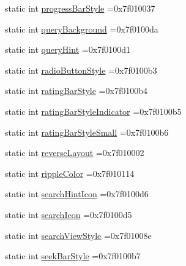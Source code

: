 \begin{DoxyCompactItemize}
\item 
static int \hyperlink{classandroid_1_1support_1_1graphics_1_1drawable_1_1animated_1_1R_1_1attr_aab0f409b24c8668e3fbe6e1fc3211c29}{progress\+Bar\+Style} =0x7f010037
\item 
static int \hyperlink{classandroid_1_1support_1_1graphics_1_1drawable_1_1animated_1_1R_1_1attr_a0306023b5d4883dacd62d9a41e38c608}{query\+Background} =0x7f0100da
\item 
static int \hyperlink{classandroid_1_1support_1_1graphics_1_1drawable_1_1animated_1_1R_1_1attr_a4720a94b3f352aacb47badc751047441}{query\+Hint} =0x7f0100d1
\item 
static int \hyperlink{classandroid_1_1support_1_1graphics_1_1drawable_1_1animated_1_1R_1_1attr_a191038a5c71147a04311b671f74cc7b0}{radio\+Button\+Style} =0x7f0100b3
\item 
static int \hyperlink{classandroid_1_1support_1_1graphics_1_1drawable_1_1animated_1_1R_1_1attr_a27909b0f9ddcebfdedc104a8ae901712}{rating\+Bar\+Style} =0x7f0100b4
\item 
static int \hyperlink{classandroid_1_1support_1_1graphics_1_1drawable_1_1animated_1_1R_1_1attr_a9658313464fe73647655b17e36cd0203}{rating\+Bar\+Style\+Indicator} =0x7f0100b5
\item 
static int \hyperlink{classandroid_1_1support_1_1graphics_1_1drawable_1_1animated_1_1R_1_1attr_ae91fa42b366d98c3a89084501c93d39e}{rating\+Bar\+Style\+Small} =0x7f0100b6
\item 
static int \hyperlink{classandroid_1_1support_1_1graphics_1_1drawable_1_1animated_1_1R_1_1attr_a08e28355209f9e2acee1a23a9474beb7}{reverse\+Layout} =0x7f010002
\item 
static int \hyperlink{classandroid_1_1support_1_1graphics_1_1drawable_1_1animated_1_1R_1_1attr_a7f3d5ddc3c625795d695d54870ec4b82}{ripple\+Color} =0x7f010114
\item 
static int \hyperlink{classandroid_1_1support_1_1graphics_1_1drawable_1_1animated_1_1R_1_1attr_a636b74fcad1e952ad0235e10f94b9322}{search\+Hint\+Icon} =0x7f0100d6
\item 
static int \hyperlink{classandroid_1_1support_1_1graphics_1_1drawable_1_1animated_1_1R_1_1attr_a0ed748bfb2acb60da8ebcdec57c76efc}{search\+Icon} =0x7f0100d5
\item 
static int \hyperlink{classandroid_1_1support_1_1graphics_1_1drawable_1_1animated_1_1R_1_1attr_ad21cbd2fdc86db9838e96d1370a7495d}{search\+View\+Style} =0x7f01008e
\item 
static int \hyperlink{classandroid_1_1support_1_1graphics_1_1drawable_1_1animated_1_1R_1_1attr_ae0cecff2acda4bdb5b7981694f86702a}{seek\+Bar\+Style} =0x7f0100b7

\end{DoxyCompactItemize}
